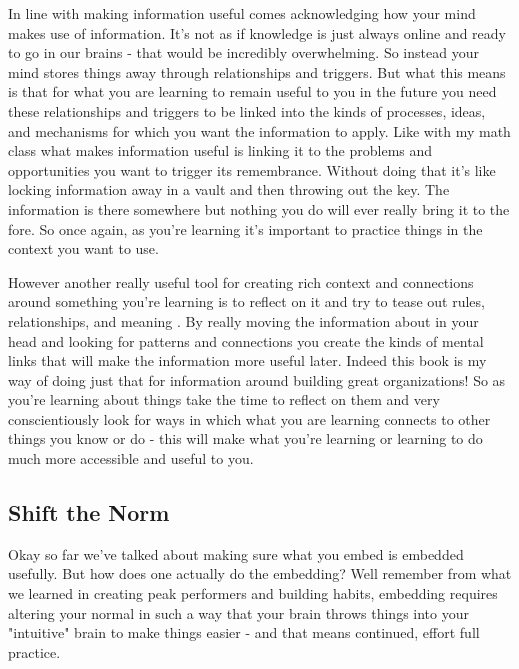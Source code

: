 \documentclass[11pt,a5paper]{book}
\begin{document}
In line with making information useful comes acknowledging how your mind makes use of information. It's not as if knowledge is just always online and ready to go in our brains - that would be incredibly overwhelming. So instead your mind stores things away through relationships and triggers. But what this means is that for what you are learning to remain useful to you in the future you need these relationships and triggers to be linked into the kinds of processes, ideas, and mechanisms for which you want the information to apply. Like with my math class what makes information useful is linking it to the problems and opportunities you want to trigger its remembrance. Without doing that it's like locking information away in a vault and then throwing out the key. The information is there somewhere but nothing you do will ever really bring it to the fore. So once again, as you're learning it's important to practice things in the context you want to use. 
\newline

However another really useful tool for creating rich context and connections around something you're learning is to reflect on it and try to tease out rules, relationships, and meaning \cite{stick}. By really moving the information about in your head and looking for patterns and connections you create the kinds of mental links that will make the information more useful later. Indeed this book is my way of doing just that for information around building great organizations! So as you're learning about things take the time to reflect on them and very conscientiously look for ways in which what you are learning connects to other things you know or do - this will make what you're learning or learning to do much more accessible and useful to you. 
\newline

\subsection{Shift the Norm}
Okay so far we've talked about making sure what you embed is embedded usefully. But how does one actually do the embedding? Well remember from what we learned in creating peak performers and building habits, embedding requires altering your normal in such a way that your brain throws things into your "intuitive" brain to make things easier \cite{duhigg} \cite{ericsson} - and that means continued, effort full  practice. 
\newline
\end{document}
